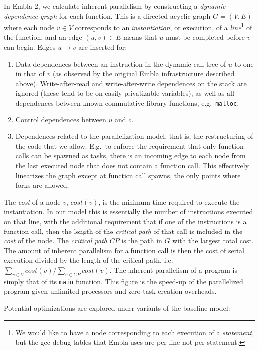 In Embla 2, we calculate inherent parallelism by constructing a \emph{dynamic dependence graph} for each function.
This is a directed acyclic graph $G=(V,E)$ where each node $v\in V$ corresponds to an \emph{instantiation},
or execution, of a \emph{line}\footnote{We would like to have a node corresponding to each execution of a \emph{statement}, but the gcc debug tables that Embla uses are per-line not per-statement.} of the function,
and an edge $(u,v)\in E$ means that $u$ must be completed before $v$ can begin.
Edges $u \rightarrow v$ are inserted for:
\begin{enumerate}
\item
Data dependences between an instruction in the dynamic call tree of $u$ to one
in that of $v$ (as observed by the original Embla infrastructure described
above). Write-after-read and write-after-write dependences on the stack are
ignored (these tend to be on easily privatizable variables), as well as all
dependences between known commutative library functions, e.g.\ \texttt{malloc}.
\item
Control dependences between $u$ and $v$.
\item \label{dep-enum-model}
Dependences related to the parallelization model, that is, the restructuring of the code that we allow.
E.g.\ to enforce the requirement that only function calls can be spawned as tasks, there is an incoming edge to each node from the last executed node that does not contain a function call.
This effectively linearizes the graph except at function call spawns, the only points where forks are allowed.
\end{enumerate} 
The \emph{cost} of a node $v$, $\mathit{cost}(v)$,
is the minimum time required to execute the instantiation.
In our model this is essentially the number of instructions executed on that line,
with the additional requirement that if one of the instructions is a function call,
then the length of the \emph{critical path} of that call is included in the
\emph{cost} of the node.
The \emph{critical path} $\mathit{CP}$ is the path in $G$ with the largest total cost.
The amount of inherent parallelism for a function call is then the cost of serial execution divided by the length of the critical path,
i.e. $\sum_{v\in V} \mathit{cost}(v)/\sum_{v\in \mathit{CP}} \mathit{cost}(v)$.
The inherent parallelism of a program is simply that of its \texttt{main} function.
This figure is the speed-up of the parallelized program given unlimited
processors and zero task creation overheads.

Potential optimizations are explored under variants of the baseline model:


